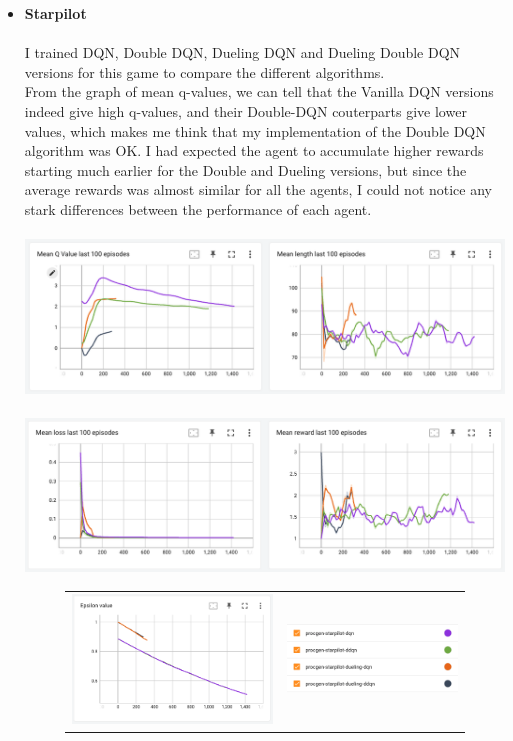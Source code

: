 \documentclass[paper=a4, fontsize=11pt, margin=1in]{scrartcl}
\numberwithin{equation}{section}		%
\numberwithin{figure}{section}			%
\numberwithin{table}{section}				%
\begin{document}
\begin{itemize}
    \item \textbf{Starpilot}\\\\
    I trained DQN, Double DQN, Dueling DQN and Dueling Double DQN versions for this game to compare the different algorithms.\\
    From the graph of mean q-values, we can tell that the Vanilla DQN versions indeed give high q-values, and their Double-DQN couterparts give lower values, which makes me think that my implementation of the Double DQN algorithm was OK. I had expected the agent to accumulate higher rewards starting much earlier for the Double and Dueling versions, but since the average rewards was almost similar for all the agents, I could not notice any stark differences between the performance of each agent. \\\\
    \includegraphics[scale=0.4]{star1.png}\\\\
    \includegraphics[scale=0.4]{star2.png}
    \begin{figure}[h]
    \begin{tabular}{ll}
    \hspace*{8mm}\includegraphics[width=0.5\linewidth]{star3.png}
    &
    \includegraphics[scale=0.4]{star4.png}
    \end{tabular}
    \end{figure}


\end{itemize}
\end{document}
